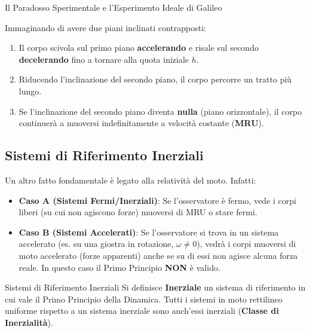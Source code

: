 \begin{esercizio}{Il Paradosso Sperimentale e l'Esperimento Ideale di Galileo}
\begin{center}
    \end{center}

Immaginando di avere due piani inclinati contrapposti:
\begin{enumerate}
    \item Il corpo scivola sul primo piano \textbf{accelerando} e risale sul secondo \textbf{decelerando} fino a tornare alla quota iniziale $h$.
    \item Riducendo l'inclinazione del secondo piano, il corpo percorre un tratto più lungo.
    \item Se l'inclinazione del secondo piano diventa \textbf{nulla} (piano orizzontale), il corpo continuerà a muoversi indefinitamente a velocità costante (\textbf{MRU}).
\end{enumerate}
\end{esercizio}

\subsection{Sistemi di Riferimento Inerziali}
Un altro fatto fondamentale è legato alla relatività del moto.
Infatti:
\begin{itemize}
    \item \textbf{Caso A (Sistemi Fermi/Inerziali)}: Se l'osservatore è fermo, vede i corpi liberi (su cui non agiscono forze) muoversi di MRU o stare fermi.
    \item \textbf{Caso B (Sistemi Accelerati)}: Se l'osservatore si trova in un sistema accelerato (es. su una giostra in rotazione, $\omega \neq 0$), vedrà i corpi muoversi di moto accelerato (forze apparenti) anche se su di essi non agisce alcuna forza reale. In questo caso il Primo Principio \textbf{NON} è valido.
\end{itemize}

\begin{definizione}{Sistemi di Riferimento Inerziali}
Si definisce \textbf{Inerziale} un sistema di riferimento in cui vale il Primo Principio della Dinamica. Tutti i sistemi in moto rettilineo uniforme rispetto a un sistema inerziale sono anch'essi inerziali (\textbf{Classe di Inerzialità}).
\end{definizione}

